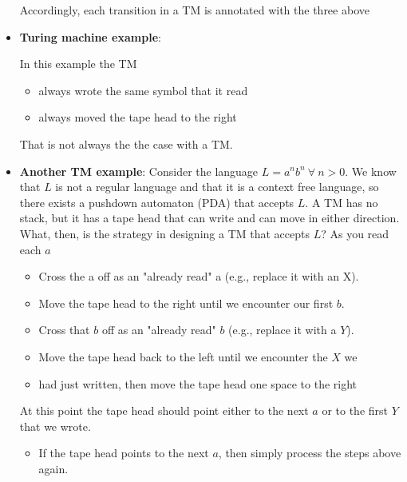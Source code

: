 \documentclass{report}
\begin{document}
\begin{itemize}
\begin{enumerate}
            \end{enumerate}
            \bigbreak \noindent 
            Accordingly, each transition in a TM is annotated with the three above
        \item \textbf{Turing machine example}:
            \bigbreak \noindent 
            \begin{figure}[ht]
                \centering
                \label{fig:t1}
            \end{figure}
            \bigbreak \noindent 
            In this example the TM
            \begin{itemize}
                \item always wrote the same symbol that it read
                \item always moved the tape head to the right
            \end{itemize}
            That is not always the the case with a TM.
        \item \textbf{Another TM example}: Consider the language $L = a^{n}b^{n} \ \forall \ n> 0$. We know that $L$ is not a regular language and that it is a context free language, so there exists a pushdown automaton (PDA) that accepts $L$.
            \bigbreak \noindent 
            A TM has no stack, but it has a tape head that can write and can move in either direction. What, then, is the strategy in designing a TM that accepts $L$?
            \bigbreak \noindent 
            As you read each $a$
            \begin{itemize}
                \item Cross the a off as an "already read" a (e.g., replace it with an X).
                \item Move the tape head to the right until we encounter our first $b $.
                \item Cross that $b$ off as an "already read" $b$ (e.g., replace it with a $Y$).
                \item Move the tape head back to the left until we encounter the $X$ we
                \item had just written, then move the tape head one space to the right
            \end{itemize}
            At this point the tape head should point either to the next $a$ or to the first $Y$ that we wrote.
            \begin{itemize}
                \item If the tape head points to the next $a$, then simply process the steps above again.

\end{itemize}
\end{itemize}
\end{document}
